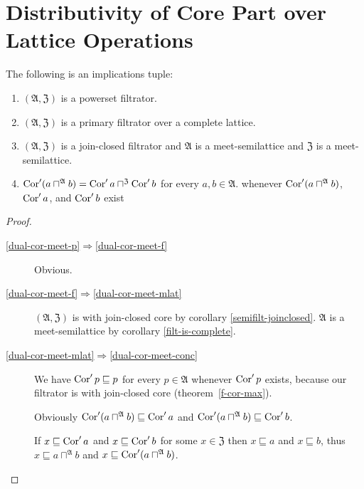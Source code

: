 \section{Distributivity of Core Part over Lattice Operations}
\begin{thm}
\label{dual-cor-meet}The following is an implications tuple:
\begin{enumerate}
\item \label{dual-cor-meet-p}$(\mathfrak{A},\mathfrak{Z})$ is a powerset
filtrator.
\item \label{dual-cor-meet-f}$(\mathfrak{A},\mathfrak{Z})$ is a primary
filtrator over a complete lattice.
\item \label{dual-cor-meet-mlat}$(\mathfrak{A},\mathfrak{Z})$ is a join-closed
filtrator and $\mathfrak{A}$ is a meet-semilattice and $\mathfrak{Z}$
is a meet-semilattice.
\item \label{dual-cor-meet-conc}$\operatorname{Cor}'(a\sqcap^{\mathfrak{A}}b)=\operatorname{Cor}'a\sqcap^{\mathfrak{Z}}\operatorname{Cor}'b$
for every $a,b\in\mathfrak{A}$.
whenever $\operatorname{Cor}'(a\sqcap^{\mathfrak{A}}b)$, $\operatorname{Cor}'a$, and
$\operatorname{Cor}'b$ exist
\end{enumerate}
\end{thm}
\begin{proof}
~
\begin{description}
\item [{\ref{dual-cor-meet-p}$\Rightarrow$\ref{dual-cor-meet-f}}] Obvious.
\item [{\ref{dual-cor-meet-f}$\Rightarrow$\ref{dual-cor-meet-mlat}}] $(\mathfrak{A},\mathfrak{Z})$
is with join-closed core by corollary \ref{semifilt-joinclosed}.
$\mathfrak{A}$ is a meet-semilattice by corollary \ref{filt-is-complete}.
\item [{\ref{dual-cor-meet-mlat}$\Rightarrow$\ref{dual-cor-meet-conc}}] We have $\operatorname{Cor}'p\sqsubseteq p$ for every $p\in\mathfrak{A}$ whenever $\operatorname{Cor}'p$ exists, because
our filtrator is with join-closed core (theorem~\ref{f-cor-max}).


Obviously $\operatorname{Cor}'(a\sqcap^{\mathfrak{A}}b)\sqsubseteq\operatorname{Cor}'a$ and $\operatorname{Cor}'(a\sqcap^{\mathfrak{A}}b)\sqsubseteq\operatorname{Cor}'b$.


If $x\sqsubseteq\operatorname{Cor}'a$ and $x\sqsubseteq\operatorname{Cor}'b$ for some $x\in\mathfrak{Z}$
then $x\sqsubseteq a$ and $x\sqsubseteq b$, thus $x\sqsubseteq a\sqcap^{\mathfrak{A}}b$
and $x\sqsubseteq\operatorname{Cor}'(a\sqcap^{\mathfrak{A}}b)$.

\end{description}
\end{proof}
